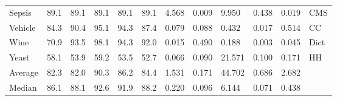 \begin{tabular}{llllllllllll}
Sepsis              &        89.1 &  89.1 &  89.1 &  89.1 &   89.1 &                 4.568 &  0.009 &    9.950 &  0.438 &   0.019 &   CMS \\
Vehicle             &        84.3 &  90.4 &  95.1 &  94.3 &   87.4 &                 0.079 &  0.088 &    0.432 &  0.017 &   0.514 &    CC \\
Wine                &        70.9 &  93.5 &  98.1 &  94.3 &   92.0 &                 0.015 &  0.490 &    0.188 &  0.003 &   0.045 &  Dict \\
Yeast               &        58.1 &  53.9 &  59.2 &  53.5 &   52.7 &                 0.066 &  0.090 &   21.571 &  0.100 &   0.171 &    HH \\
Average             &        82.3 &  82.0 &  90.3 &  86.2 &   84.4 &                 1.531 &  0.171 &   44.702 &  0.686 &   2.682 &       \\
Median              &        86.1 &  88.1 &  92.6 &  91.9 &   88.2 &                 0.220 &  0.096 &    6.144 &  0.071 &   0.438 &       \\
\bottomrule
\end{tabular}
